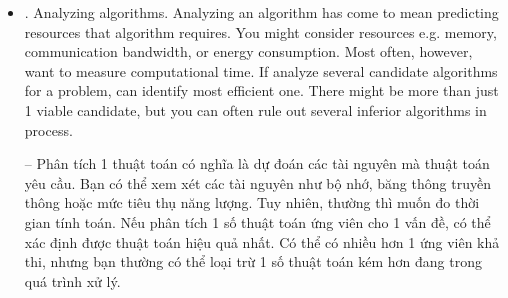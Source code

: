 \documentclass{article}
\begin{document}
\begin{itemize}
\begin{itemize}
\begin{itemize}
            -- Mã giả cho sắp xếp chèn được đưa ra dưới dạng thủ tục INSERTION-SORT. Nó lấy 2 tham số: 1 mảng $A$ chứa các giá trị cần sắp xếp \& số $n$ giá trị cần sắp xếp. Các giá trị chiếm các vị trí từ $A[1]$ đến $A[n]$ của mảng, mà chúng ta ký hiệu là $A[1:n]$. Khi thủ tục INSERTION-SORT hoàn tất, mảng $A[1:n]$ chứa các giá trị gốc, nhưng theo thứ tự đã sắp xếp.
            
            INSERTION-SORT$(A,n)$
            \begin{Verbatim}[numbers=left,xleftmargin=5mm]
for i = 2 to n
    key = A[i]
    // insert A[i] into sorted subarray A[1:i - 1]
    j = i - 1
    while j > 0 and A[j] > key
        A[j + 1] = A[j]
        j = j - 1
    A[j + 1] = key
            \end{Verbatim}
            {\bf Loop invariants \& correctness of insertion sort.} p. 47+++            
            
            \item {. Analyzing algorithms.} Analyzing an algorithm has come to mean predicting resources that algorithm requires. You might consider resources e.g. memory, communication bandwidth, or energy consumption. Most often, however, want to measure computational time. If analyze several candidate algorithms for a problem, can identify most efficient one. There might be more than just 1 viable candidate,  but you can often rule out several inferior algorithms in process.
            
            -- Phân tích 1 thuật toán có nghĩa là dự đoán các tài nguyên mà thuật toán yêu cầu. Bạn có thể xem xét các tài nguyên như bộ nhớ, băng thông truyền thông hoặc mức tiêu thụ năng lượng. Tuy nhiên, thường thì muốn đo thời gian tính toán. Nếu phân tích 1 số thuật toán ứng viên cho 1 vấn đề, có thể xác định được thuật toán hiệu quả nhất. Có thể có nhiều hơn 1 ứng viên khả thi, nhưng bạn thường có thể loại trừ 1 số thuật toán kém hơn đang trong quá trình xử lý.
            

\end{itemize}
\end{itemize}
\end{itemize}
\end{document}
